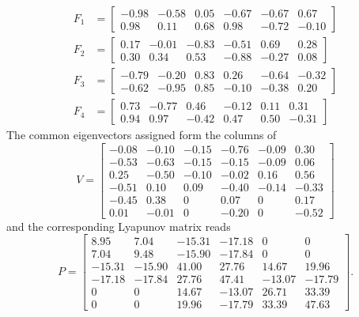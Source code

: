 \documentclass[11pt]{article}
\theoremstyle{plain}
\theoremstyle{definition}
\theoremstyle{remark}
\begin{document}
\begin{align*}
    F_{1} &= \left[\begin{smallmatrix}
    -0.98 & -0.58 & 0.05 & -0.67 & -0.67 & 0.67 \\
    0.98 & 0.11 & 0.68 & 0.98 & -0.72 & -0.10
\end{smallmatrix}\right] \\
    F_{2} &= \left[\begin{smallmatrix}
    0.17 & -0.01 & -0.83 & -0.51 & 0.69 & 0.28 \\
    0.30 & 0.34 & 0.53 & -0.88 & -0.27 & 0.08
\end{smallmatrix}\right] \\
    F_{3} &= \left[\begin{smallmatrix}
    -0.79 & -0.20 & 0.83 & 0.26 & -0.64 & -0.32 \\
    -0.62 & -0.95 & 0.85 & -0.10 & -0.38 & 0.20
\end{smallmatrix}\right] \\
    F_{4} &= \left[\begin{smallmatrix}
    0.73 & -0.77 & 0.46 & -0.12 & 0.11 & 0.31 \\
    0.94 & 0.97 & -0.42 & 0.47 & 0.50 & -0.31
\end{smallmatrix}\right]
\end{align*}
The common eigenvectors assigned form the columns of
\[
V = \left[\begin{smallmatrix}
    -0.08 & -0.10 & -0.15 & -0.76 & -0.09 & 0.30 \\
    -0.53 & -0.63 & -0.15 & -0.15 & -0.09 & 0.06 \\
    0.25 & -0.50 & -0.10 & -0.02 & 0.16 & 0.56 \\
    -0.51 & 0.10 & 0.09 & -0.40 & -0.14 & -0.33 \\
    -0.45 & 0.38 & 0 & 0.07 & 0 & 0.17 \\
    0.01 & -0.01 & 0 & -0.20 & 0 & -0.52
\end{smallmatrix}\right]
\]
and the corresponding Lyapunov matrix reads
\[
P = \left[\begin{smallmatrix}
    8.95 & 7.04 & -15.31 & -17.18 & 0 & 0 \\
    7.04 & 9.48 & -15.90 & -17.84 & 0 & 0 \\
    -15.31 & -15.90 & 41.00 & 27.76 & 14.67 & 19.96 \\
    -17.18 & -17.84 & 27.76 & 47.41 & -13.07 & -17.79 \\
    0 & 0 & 14.67 & -13.07 & 26.71 & 33.39 \\
    0 & 0 & 19.96 & -17.79 & 33.39 & 47.63
\end{smallmatrix}\right].
\]
\end{document}
